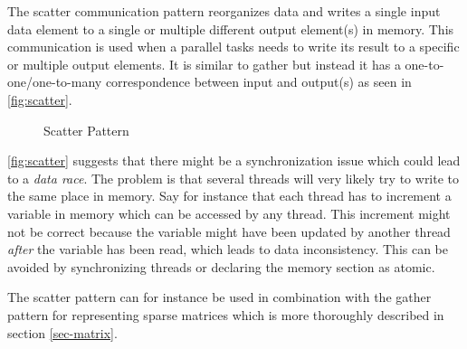 The scatter communication pattern reorganizes data and writes a single input data element to a single or multiple different output element(s) in memory.
This communication is used when a parallel tasks needs to write its result to a specific or multiple output elements.
It is similar to gather but instead it has a one-to-one/one-to-many correspondence between input and output(s) as seen in \autoref{fig:scatter}.
\begin{figure}[ht]
	\centering
	\caption{Scatter Pattern}
	\label{fig:scatter}
\end{figure}
\autoref{fig:scatter} suggests that there might be a synchronization issue which could lead to a \textit{data race}.
The problem is that several threads will very likely try to write to the same place in memory.
Say for instance that each thread has to increment a variable in memory which can be accessed by any thread.
This increment might not be correct because the variable might have been updated by another thread \textit{after} the variable has been read, which leads to data inconsistency.
This can be avoided by synchronizing threads or declaring the memory section as atomic.

The scatter pattern can for instance be used in combination with the gather pattern for representing sparse matrices which is more thoroughly described in section \autoref{sec-matrix}.